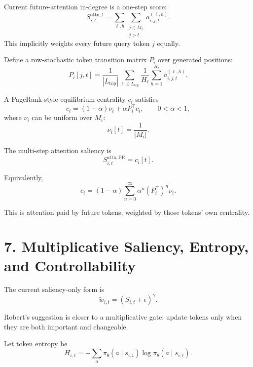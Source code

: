 \documentclass[11pt]{article}
\begin{document}
Current future-attention in-degree is a one-step score:
\begin{equation}
  S^{\mathrm{attn},1}_{i,t}
  =
  \sum_{\ell,h}
  \sum_{\substack{j \in M_i \\ j > t}}
  a^{(\ell,h)}_{i,j,t}.
\end{equation}
This implicitly weights every future query token $j$ equally.

Define a row-stochastic token transition matrix $P_i$ over generated positions:
\begin{equation}
  P_i[j,t]
  =
  \frac{1}{|L_{\mathrm{top}}|}
  \sum_{\ell \in L_{\mathrm{top}}}
  \frac{1}{H_\ell}
  \sum_{h=1}^{H_\ell}
  a^{(\ell,h)}_{i,j,t}.
\end{equation}

A PageRank-style equilibrium centrality $c_i$ satisfies
\begin{equation}
  c_i
  =
  (1-\alpha) \nu_i
  +
  \alpha P_i^\top c_i,
  \qquad
  0 < \alpha < 1,
\end{equation}
where $\nu_i$ can be uniform over $M_i$:
\begin{equation}
  \nu_i[t]
  =
  \frac{1}{|M_i|}.
\end{equation}

The multi-step attention saliency is
\begin{equation}
  S^{\mathrm{attn},\mathrm{PR}}_{i,t}
  =
  c_i[t].
\end{equation}

Equivalently,
\begin{equation}
  c_i
  =
  (1-\alpha)
  \sum_{n=0}^{\infty}
  \alpha^n
  \left(P_i^\top\right)^n
  \nu_i.
\end{equation}

This is attention paid by future tokens, weighted by those tokens' own
centrality.

\section*{7. Multiplicative Saliency, Entropy, and Controllability}

The current saliency-only form is
\begin{equation}
  \tilde w_{i,t}
  =
  \left(S_{i,t} + \epsilon\right)^\gamma.
\end{equation}

Robert's suggestion is closer to a multiplicative gate: update tokens only
when they are both important and changeable.

Let token entropy be
\begin{equation}
  H_{i,t}
  =
  -
  \sum_a
  \pi_\theta(a \mid s_{i,t})
  \log \pi_\theta(a \mid s_{i,t}).
\end{equation}
\end{document}
